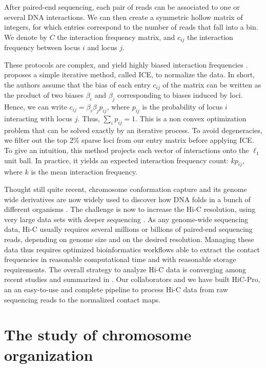 After paired-end sequencing, each pair of reads can be associated to one
\citep{lieberman-aiden:comprehensive} or several \citep{ay:identifying} DNA
interactions. We can then create a symmetric hollow matrix of integers, for
which entries correspond to the number of reads that fall into a bin. We
denote by $C$ the interaction frequency matrix, and $c_{ij}$ the interaction
frequency between locus $i$ and locus $j$.

These protocols are complex, and yield highly biased interaction frequencies
\citep{imakaev:iterative, cournac:normalization, yaffe:probabilistic}.
\citet{imakaev:iterative} proposes a simple iterative method, called ICE, to
normalize the data. In short, the authors assume that the bias of each entry
$c_{ij}$ of the matrix can be written as the product of two biases $\beta_i$
and $\beta_j$ corresponding to biases induced by loci. Hence, we can write
$c_{ij} = \beta_i \beta_j p_{ij}$, where $p_{ij}$ is the probability of locus
$i$ interacting with locus $j$. Thus, $\sum_i p_{ij} = 1$. This is a non convex
optimization problem that can be solved exactly by an iterative process. To
avoid degeneracies, we filter out the top 2\% sparse loci from our entry
matrix before applying ICE. To give an intuition, this method projects each
vector of interactions onto the $\ell_1$ unit ball. In practice, it yields an
expected interaction frequency count: $k p_{ij}$, where $k$ is the mean
interaction frequency.

Thought still quite recent, chromosome conformation capture and its genome
wide derivatives are now widely used to discover how DNA folds in a bunch of
different organisms \citep{duan:three, sexton:three-dimensional,
tanizawa:mapping, ay:three-dimensional}. The challenge is now to increase the
Hi-C resolution, using very large data sets with deeper sequencing
\citep{rao:3d, jin:high-resolution}. As any genome-wide sequencing data, Hi-C
usually requires several millions or billions of paired-end sequencing reads,
depending on genome size and on the desired resolution. Managing these data
thus requires optimized bioinformatics workflows able to extract the contact
frequencies in reasonable computational time and with reasonable storage
requirements. The overall strategy to analyze Hi-C data is converging among
recent studies and summarized in \cite{lajoie:hitchhiker}. Our collaborators
and we have built HiC-Pro, an an easy-to-use and complete pipeline to process
Hi-C data from raw sequencing reads to the normalized contact maps.

\section{The study of chromosome organization}

